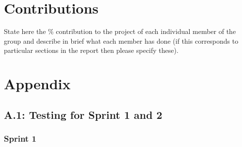 \documentclass[a4paper, oneside, 11pt]{report}
\begin{document}



\chapter*{Contributions}

State here the \% contribution to the project of each individual member of the group and describe in brief what each member has done (if this corresponds to particular sections in the report then please specify these).

\chapter*{Appendix}

\section*{A.1: Testing for Sprint 1 and 2}
\label{testing}

\subsection*{Sprint 1}
\end{document}

